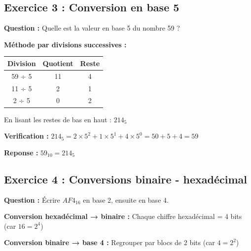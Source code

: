 \documentclass[12pt,a4paper]{article}
\begin{document}
\newpage
\subsection{Exercice 3 : Conversion en base 5}

\begin{exercice}
\textbf{Question :} Quelle est la valeur en base 5 du nombre 59 ?
\end{exercice}

\begin{solution}
\textbf{Méthode par divisions successives :}

\begin{center}
\begin{tabular}{|c|c|c|}
\hline
\textbf{Division} & \textbf{Quotient} & \textbf{Reste} \\
\hline
59 ÷ 5 & 11 & 4 \\
11 ÷ 5 & 2 & 1 \\
2 ÷ 5 & 0 & 2 \\
\hline
\end{tabular}
\end{center}

En lisant les restes de bas en haut : $214_5$

\textbf{Verification :}
$214_5 = 2 \times 5^2 + 1 \times 5^1 + 4 \times 5^0 = 50 + 5 + 4 = 59$

\textcolor{importantrouge}{\textbf{Reponse : }} $59_{10} = 214_5$
\end{solution}

\newpage
\subsection{Exercice 4 : Conversions binaire - hexadécimal}

\begin{exercice}
\textbf{Question :} Écrire $AF4_{16}$ en base 2, ensuite en base 4.
\end{exercice}

\begin{methode}
\textbf{Conversion hexadécimal → binaire :} Chaque chiffre hexadécimal = 4 bits (car $16 = 2^4$)

\textbf{Conversion binaire → base 4 :} Regrouper par blocs de 2 bits (car $4 = 2^2$)
\end{methode}
\end{document}
